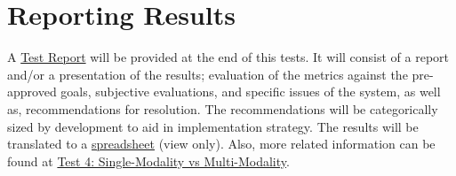 \section{Reporting Results}

A \hyperlink{https://github.com/MIMBCD-UI/research-reports}{Test Report} will be provided at the end of this tests. It will consist of a report and/or a presentation of the results; evaluation of the metrics against the pre-approved goals, subjective evaluations, and specific issues of the system, as well as, recommendations for resolution. The recommendations will be categorically sized by development to aid in implementation strategy. The results will be translated to a \hyperlink{https://docs.google.com/spreadsheets/d/1CoPLONnINdBWryGs7SBRuPZA-DnQ0t_yzx3u8ym0UoI/edit?usp=sharing}{spreadsheet} (view only). Also, more related information can be found at \hyperlink{https://github.com/MIMBCD-UI/prototype-breast-screening/wiki/User-Test-Evaluation}{Test 4: Single-Modality vs Multi-Modality}.